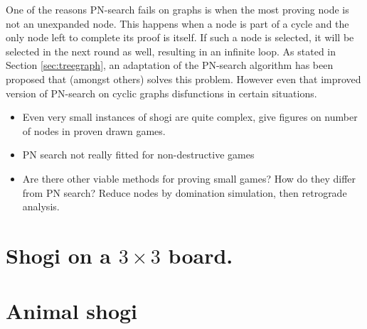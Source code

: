 \documentclass{article}
\begin{document}
One of the reasons PN-search fails on graphs is when the most proving node is not an unexpanded node. This happens when a node is part of a cycle
and the only node left to complete its proof is itself. If such a node is selected, it will be selected in the next round as well, resulting
in an infinite loop. As stated in Section \ref{sec:treegraph}, an adaptation of the PN-search algorithm has been proposed that (amongst others)
solves this problem. However even that improved version of PN-search on cyclic graphs disfunctions in certain situations.


\begin{itemize}
	\item Even very small instances of shogi are quite complex, give figures on number of nodes in proven drawn games.
	\item PN search not really fitted for non-destructive games
	\item Are there other viable methods for proving small games? How do they differ from PN search? Reduce nodes by domination simulation, then retrograde analysis.
\end{itemize}

{\appendix
\section{Shogi on a $3 \times 3$ board.}
\label{3x3rules}

\section{Animal shogi}
\label{dobutsu}
}
{}

\end{document}
